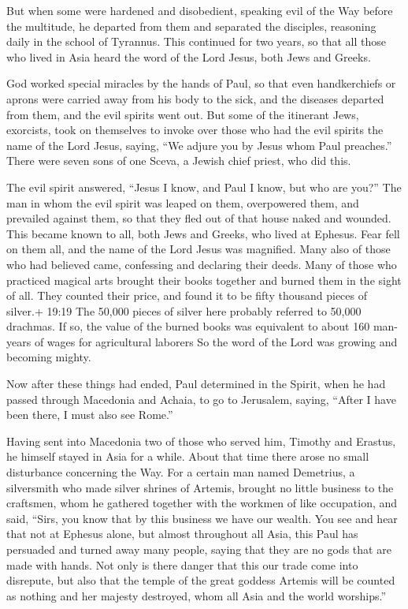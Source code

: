  But when some were hardened and disobedient, speaking evil
of the Way before the multitude, he departed from them and separated the
disciples, reasoning daily in the school of Tyrannus.  This
continued for two years, so that all those who lived in Asia heard the
word of the Lord Jesus, both Jews and Greeks.

 God worked special miracles by the hands of Paul,
 so that even handkerchiefs or aprons were carried away
from his body to the sick, and the diseases departed from them, and the
evil spirits went out.  But some of the itinerant Jews,
exorcists, took on themselves to invoke over those who had the evil
spirits the name of the Lord Jesus, saying, ``We adjure you by Jesus
whom Paul preaches.''  There were seven sons of one Sceva,
a Jewish chief priest, who did this.

 The evil spirit answered, ``Jesus I know, and Paul I know,
but who are you?''  The man in whom the evil spirit was
leaped on them, overpowered them, and prevailed against them, so that
they fled out of that house naked and wounded.  This became
known to all, both Jews and Greeks, who lived at Ephesus. Fear fell on
them all, and the name of the Lord Jesus was magnified. 
Many also of those who had believed came, confessing and declaring their
deeds.  Many of those who practiced magical arts brought
their books together and burned them in the sight of all. They counted
their price, and found it to be fifty thousand pieces of silver.+ 19:19
The 50,000 pieces of silver here probably referred to 50,000 drachmas.
If so, the value of the burned books was equivalent to about 160
man-years of wages for agricultural laborers  So the word
of the Lord was growing and becoming mighty.

 Now after these things had ended, Paul determined in the
Spirit, when he had passed through Macedonia and Achaia, to go to
Jerusalem, saying, ``After I have been there, I must also see Rome.''

 Having sent into Macedonia two of those who served him,
Timothy and Erastus, he himself stayed in Asia for a while.
 About that time there arose no small disturbance
concerning the Way.  For a certain man named Demetrius, a
silversmith who made silver shrines of Artemis, brought no little
business to the craftsmen,  whom he gathered together with
the workmen of like occupation, and said, ``Sirs, you know that by this
business we have our wealth.  You see and hear that not at
Ephesus alone, but almost throughout all Asia, this Paul has persuaded
and turned away many people, saying that they are no gods that are made
with hands.  Not only is there danger that this our trade
come into disrepute, but also that the temple of the great goddess
Artemis will be counted as nothing and her majesty destroyed, whom all
Asia and the world worships.''

